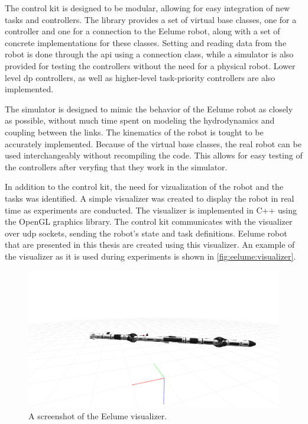 The control kit is designed to be modular, allowing for easy integration of
new tasks and controllers. The library provides a set of virtual base classes,
one for a controller and one for a connection to the Eelume robot, along with
a set of concrete implementations for these classes. Setting and reading data
from the robot is done through the \gls{api} using a connection class, while 
a simulator is also provided for testing the controllers without the need for
a physical robot. Lower level \gls{dp} controllers, as well as higher-level
task-priority controllers are also implemented.

The simulator is designed to mimic the behavior of the Eelume robot as closely
as possible, without much time spent on modeling the hydrodynamics and coupling
between the links. The kinematics of the robot is tought to be accurately
implemented. Because of the virtual base classes, the real robot can be used
interchangeably without recompiling the code. This allows for easy testing of
the controllers after veryfing that they work in the simulator.

In addition to the control kit, the need for vizualization of the robot and
the tasks was identified. A simple visualizer was created to display the robot
in real time as experiments are conducted. The visualizer is implemented in
C++ using the OpenGL graphics library. The control kit communicates with the
visualizer over \gls{udp} sockets, sending the robot's state and task definitions.
Eelume robot that are presented in this thesis are created using this visualizer.
An example of the visualizer as it is used during experiments is shown in
\autoref{fig:eelume:visualizer}.

\begin{figure}[h!]
    \centering
    \includegraphics[width=\textwidth]{assets/eely-visualizer.png}
    \caption{A screenshot of the Eelume visualizer.}
    \label{fig:eelume:visualizer}
\end{figure}


